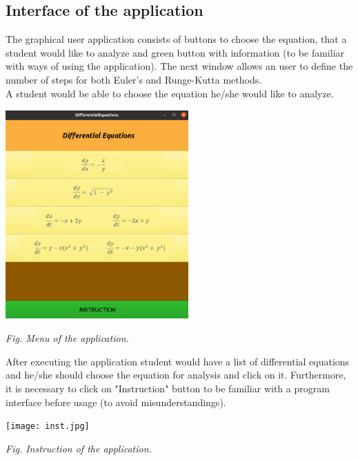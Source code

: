 \documentclass{article}
\begin{document}
\subsection{Interface of the application}
The graphical user application consists of buttons to choose the equation, that a student would like to analyze and green button with information (to be familiar with ways of using the application). The next window allows an user to define the number of steps for both Euler's and Runge-Kutta methods. \\
A student would be able to choose the equation he/she would like to analyze.

\vspace{10mm}

\begin{center}
\includegraphics[width=7cm, height=8cm]{menu.jpg}
\end{center}

\centerline{\textit{Fig. Menu of the application.}} 

\vspace{15mm}

After executing the application student would have a list of differential equations and he/she should choose the equation for analysis and click on it. Furthermore, it is necessary to click on "Instruction" button to be familiar with a program interface before usage (to avoid misunderstandings).

\vspace{15mm}

\begin{center}
\texttt{[image: inst.jpg]}
\end{center}

\centerline{\textit{Fig. Instruction of the application.}} 
\end{document}
